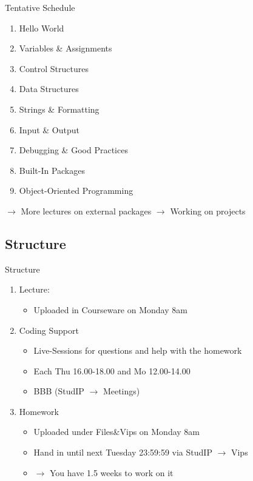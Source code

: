 \begin{frame}{Tentative Schedule}

    \begin{enumerate}
        \item Hello World
        \item Variables \& Assignments
        \item Control Structures
        \item Data Structures
        \item Strings \& Formatting
        \item Input \& Output
        \item Debugging \& Good Practices
        \item Built-In Packages
        \item Object-Oriented Programming
    \end{enumerate}
    $\rightarrow$ More lectures on external packages %
    $\rightarrow$ Working on projects

\end{frame}

\subsection{Structure}

\begin{frame}{Structure}

    \begin{enumerate}
        \item Lecture:
        \begin{itemize}
        		\item Uploaded in Courseware on Monday 8am
	\end{itemize}
        \item Coding Support
        \begin{itemize}
        		\item Live-Sessions for questions and help with the homework
		\item Each Thu 16.00-18.00 and Mo 12.00-14.00
		\item BBB (StudIP $\rightarrow$ Meetings)
	\end{itemize}
        \item Homework
        \begin{itemize}
        		\item Uploaded under Files\&Vips on Monday 8am
		\item Hand in until next Tuesday 23:59:59 via StudIP $\rightarrow$ Vips
		\item $\rightarrow$ You have 1.5 weeks to work on it
	\end{itemize}
    \end{enumerate}

\end{frame}

